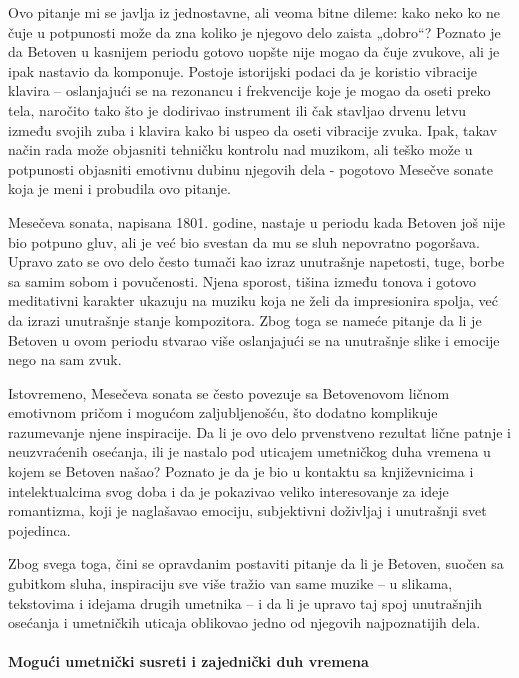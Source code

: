 \documentclass[12pt]{article}
\begin{document}
Ovo pitanje mi se javlja iz jednostavne, ali veoma bitne dileme: kako neko ko ne čuje u potpunosti može da zna koliko je njegovo delo zaista „dobro“? Poznato je da Betoven u kasnijem periodu gotovo uopšte nije mogao da čuje zvukove, ali je ipak nastavio da komponuje. Postoje istorijski podaci da je koristio vibracije klavira – oslanjajući se na rezonancu i frekvencije koje je mogao da oseti preko tela, naročito tako što je dodirivao instrument ili čak stavljao drvenu letvu između svojih zuba i klavira kako bi uspeo da oseti vibracije zvuka. Ipak, takav način rada može objasniti tehničku kontrolu nad muzikom, ali teško može u potpunosti objasniti emotivnu dubinu njegovih dela - pogotovo Mesečve sonate koja je meni i probudila ovo pitanje.

Mesečeva sonata, napisana 1801. godine, nastaje u periodu kada Betoven još nije bio potpuno gluv, ali je već bio svestan da mu se sluh nepovratno pogoršava. Upravo zato se ovo delo često tumači kao izraz unutrašnje napetosti, tuge, borbe sa samim sobom i povučenosti. Njena sporost, tišina između tonova i gotovo meditativni karakter ukazuju na muziku koja ne želi da impresionira spolja, već da izrazi unutrašnje stanje kompozitora. Zbog toga se nameće pitanje da li je Betoven u ovom periodu stvarao više oslanjajući se na unutrašnje slike i emocije nego na sam zvuk.

Istovremeno, Mesečeva sonata se često povezuje sa Betovenovom ličnom emotivnom pričom i mogućom zaljubljenošću, što dodatno komplikuje razumevanje njene inspiracije. Da li je ovo delo prvenstveno rezultat lične patnje i neuzvraćenih osećanja, ili je nastalo pod uticajem umetničkog duha vremena u kojem se Betoven našao? Poznato je da je bio u kontaktu sa književnicima i intelektualcima svog doba i da je pokazivao veliko interesovanje za ideje romantizma, koji je naglašavao emociju, subjektivni doživljaj i unutrašnji svet pojedinca.

Zbog svega toga, čini se opravdanim postaviti pitanje da li je Betoven, suočen sa gubitkom sluha, inspiraciju sve više tražio van same muzike – u slikama, tekstovima i idejama drugih umetnika – i da li je upravo taj spoj unutrašnjih osećanja i umetničkih uticaja oblikovao jedno od njegovih najpoznatijih dela.

\paragraph{Mogući umetnički susreti i zajednički duh vremena}
\end{document}
